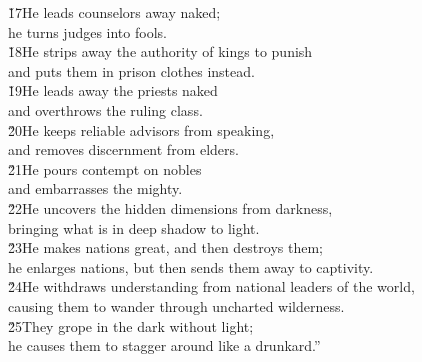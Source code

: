 \begin{poetry}
\poeml \v{17}He leads counselors away naked; \\
\poemll    he turns judges into fools. \\
\poeml \v{18}He strips away the authority of kings to punish \\
\poemll    and puts them in prison clothes instead. \\
\poeml \v{19}He leads away the priests naked \\
\poemll    and overthrows the ruling class. \\
\poeml \v{20}He keeps reliable advisors from speaking, \\
\poemll    and removes discernment from elders. \\
\poeml \v{21}He pours contempt on nobles \\
\poemll    and embarrasses the mighty. \\
\poeml \v{22}He uncovers the hidden dimensions from darkness, \\
\poemll    bringing what is in deep shadow to light. \\
\poeml \v{23}He makes nations great, and then destroys them; \\
\poemll    he enlarges nations, but then sends them away to captivity. \\
\poeml \v{24}He withdraws understanding from national leaders of the world, \\
\poemll    causing them to wander through uncharted wilderness. \\
\poeml \v{25}They grope in the dark without light; \\
\poemll    he causes them to stagger around like a drunkard.''
\end{poetry}

